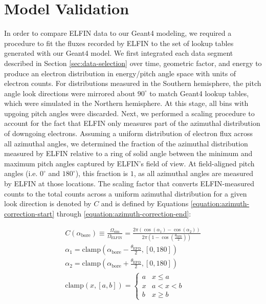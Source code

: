 \documentclass[draft]{agujournal2019}
\newcommand{\mathdeg}{^\circ}
\begin{document}
\section{Model Validation}
In order to compare ELFIN data to our Geant4 modeling, we required a procedure to fit the fluxes recorded by ELFIN to the set of lookup tables generated with our Geant4 model. We first integrated each data segment described in Section \ref{sec:data-selection} over time, geometric factor, and energy to produce an electron distribution in energy/pitch angle space with units of electron counts. For distributions measured in the Southern hemisphere, the pitch angle look directions were mirrored about $90\mathdeg$ to match Geant4 lookup tables, which were simulated in the Northern hemisphere. At this stage, all bins with upgoing pitch angles were discarded. Next, we performed a scaling procedure to account for the fact that ELFIN only measures part of the azimuthal distribution of downgoing electrons. Assuming a uniform distribution of electron flux across all azimuthal angles, we determined the fraction of the azimuthal distribution measured by ELFIN  relative to a ring of solid angle between the minimum and maximum pitch angles captured by ELFIN's field of view. At field-aligned pitch angles (i.e. $0\mathdeg$ and $180\mathdeg$), this fraction is $1$, as all azimuthal angles are measured by ELFIN at those locations. The scaling factor that converts ELFIN-measured counts to the total counts across a uniform azimuthal distribution for a given look direction is denoted by $C$ and is defined by Equations \ref{equation:azimuth-correction-start} through \ref{equation:azimuth-correction-end}:

\begin{eqnarray} 
  \label{equation:azimuth-correction-start}
  C(\alpha_\text{bore}) \equiv \frac{\Omega_\text{sim}}{\Omega_\text{ELFIN}} = \frac{2\pi \left(\cos \left(\alpha_1 \right) - \cos \left(\alpha_2 \right) \right)}{2\pi \left(1 - \cos\left(\frac{\theta_\text{EPD}}{2}\right) \right)} \\
  \alpha_1 = \text{clamp}\left(\alpha_\text{bore} - \frac{\theta_\text{EPD}}{2}, [0, 180] \right) \\
  \alpha_2 = \text{clamp}\left(\alpha_\text{bore} + \frac{\theta_\text{EPD}}{2}, [0, 180] \right) \\
  \text{clamp}(x, [a,b]) =
  \begin{cases} 
    a & x \leq a \\
    x & a < x < b \\
    b & x \geq b 
  \end{cases}
  \label{equation:azimuth-correction-end}
\end{eqnarray}
\end{document}
